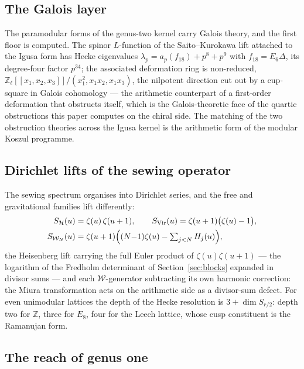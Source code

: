 \documentclass[11pt]{amsart}
\numberwithin{equation}{section}
\theoremstyle{plain}
\theoremstyle{definition}
\theoremstyle{remark}
\newcommand{\cW}{\mathcal{W}}
\newcommand{\bZ}{\mathbb{Z}}
\newcommand{\Vir}{\mathrm{Vir}}
\begin{document}
\subsection{The Galois layer}

The paramodular forms of the genus-two kernel carry Galois theory,
and the first floor is computed. The spinor $L$-function of the
Saito--Kurokawa lift attached to the Igusa form has Hecke eigenvalues
$\lambda_p=a_p(f_{18})+p^{8}+p^{9}$ with $f_{18}=E_6\Delta$, its
degree-four factor $p^{34}$; the associated deformation ring is
non-reduced,
$\bZ_\ell[[x_1,x_2,x_3]]/(x_1^{2},x_1x_2,x_1x_3)$, the nilpotent
direction cut out by a cup-square in Galois cohomology --- the
arithmetic counterpart of a first-order deformation that obstructs
itself, which is the Galois-theoretic face of the quartic
obstructions this paper computes on the chiral side. The matching of
the two obstruction theories across the Igusa kernel is the
arithmetic form of the modular Koszul programme.

\subsection{Dirichlet lifts of the sewing operator}

The sewing spectrum organises into Dirichlet series, and the free and
gravitational families lift differently:
\begin{equation}
\begin{aligned}
S_{\mathcal{H}}(u)&=\zeta(u)\,\zeta(u+1),\qquad
S_{\Vir}(u)=\zeta(u+1)\bigl(\zeta(u)-1\bigr),\\
S_{\cW_N}(u)&=\zeta(u+1)\Bigl((N{-}1)\zeta(u)-\textstyle\sum_{j<N}H_j(u)\Bigr),
\end{aligned}
\end{equation}
the Heisenberg lift carrying the full Euler product of
$\zeta(u)\zeta(u+1)$ --- the logarithm of the Fredholm determinant of
Section~\ref{sec:blocks} expanded in divisor sums --- and each
$\cW$-generator subtracting its own harmonic correction: the Miura
transformation acts on the arithmetic side as a divisor-sum defect.
For even unimodular lattices the depth of the Hecke resolution is
$3+\dim S_{r/2}$: depth two for $\bZ$, three for $E_8$, four for the
Leech lattice, whose cusp constituent is the Ramanujan form.

\subsection{The reach of genus one}
\end{document}
